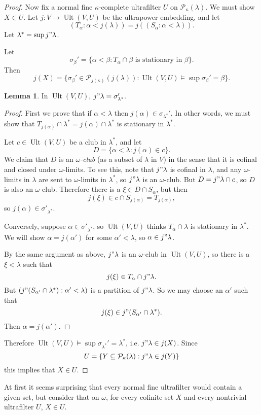 \documentclass[12pt]{report}
\newcommand{\pset}{\mathcal{P}}
\DeclareMathOperator{\Ult}{Ult}
\newcommand{\dfn}[1]{\emph{#1}\index{#1}}
\theoremstyle{definition}
\newtheorem{lemma}[theorem]{Lemma}
\begin{document}
\begin{proof}
Now fix a normal fine $\kappa$-complete ultrafilter $U$ on $\pset_\kappa(\lambda)$. We must show $X \in U$.
Let $j: V \to \Ult(V, U)$ be the ultrapower embedding, and let
$$(T_\alpha: \alpha < j(\lambda)) = j((S_\alpha: \alpha < \lambda)).$$
Let $\lambda^* = \sup j"\lambda$.

Let
$$\sigma_\beta' = \{\alpha < \beta: T_\alpha \cap \beta \text{ is stationary in } \beta\}.$$
Then
$$j(X) = \{\sigma_\beta' \in \pset_{j(\kappa)}(j(\lambda)): \Ult(V, U) \models \sup \sigma_\beta' = \beta\}.$$
\begin{lemma}
In $\Ult(V, U)$, $j"\lambda = \sigma_{\lambda^*}'.$
\end{lemma}
\begin{proof}
First we prove that if $\alpha < \lambda$ then $j(\alpha) \in \sigma_{\lambda^*}'$.
In other words, we must show that $T_{j(\alpha)} \cap \lambda^* = j(\alpha) \cap \lambda^*$ is stationary in $\lambda^*$.

Let $c \in \Ult(V, U)$ be a club in $\lambda^*$, and let
$$D = \{\alpha < \lambda: j(\alpha) \in c\}.$$
We claim that $D$ is an \dfn{$\omega$-club} (as a subset of $\lambda$ in $V$) in the sense that it is cofinal and closed under $\omega$-limits.
To see this, note that $j"\lambda$ is cofinal in $\lambda$, and any $\omega$-limits in $\lambda$ are sent to $\omega$-limits in $\lambda^*$, so $j"\lambda$ is an $\omega$-club.
But $D = j"\lambda \cap c$, so $D$ is also an $\omega$-club.
Therefore there is a $\xi \in D \cap S_\alpha$, but then
$$j(\xi) \in c \cap S_{j(\alpha)} = T_{j(\alpha)},$$
so $j(\alpha) \in \sigma'_{\lambda^*}$.

Conversely, suppose $\alpha \in \sigma'_{\lambda^*}$, so $\Ult(V, U)$ thinks $T_\alpha \cap \lambda$ is stationary in $\lambda^*$.
We will show $\alpha = j(\alpha')$ for some $\alpha' < \lambda$, so $\alpha \in j"\lambda$.

By the same argument as above, $j"\lambda$ is an $\omega$-club in $\Ult(V, U)$, so there is a $\xi < \lambda$ such that
$$j(\xi) \in T_\alpha \cap j"\lambda.$$
But $(j"(S_{\alpha'} \cap \lambda^*): \alpha' < \lambda)$ is a partition of $j"\lambda$.
So we may choose an $\alpha'$ such that
$$j(\xi) \in j"(S_{\alpha'} \cap \lambda^*).$$
Then $\alpha = j(\alpha')$.
\end{proof}
Therefore $\Ult(V, U) \models \sup \sigma_{\lambda^*}' = \lambda^*$, i.e. $j"\lambda \in j(X)$.
Since
$$U = \{Y \subseteq \pset_\kappa(\lambda): j"\lambda \in j(Y)\}$$
this implies that $X \in U$.
\end{proof}
At first it seems surprising that every normal fine ultrafilter would contain a given set, but consider that on $\omega$, for every cofinite set $X$ and every nontrivial ultrafilter $U$, $X \in U$.
\end{document}
